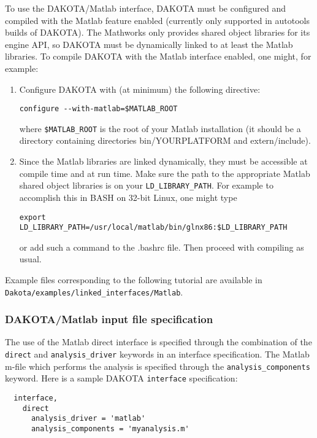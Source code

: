 To use the DAKOTA/Matlab interface, DAKOTA must be configured and
compiled with the Matlab feature enabled (currently only supported in
autotools builds of DAKOTA).  The Mathworks only provides shared
object libraries for its engine API, so DAKOTA must be dynamically
linked to at least the Matlab libraries.  To compile DAKOTA with the
Matlab interface enabled, one might, for example:
\begin{enumerate}
\item Configure DAKOTA with (at minimum) the following directive:
\begin{verbatim}
configure --with-matlab=$MATLAB_ROOT
\end{verbatim} %
where {\tt \$MATLAB\_ROOT} is the root of your Matlab installation (it should
be a directory containing directories bin/YOURPLATFORM and
extern/include).

\item Since the Matlab libraries are linked dynamically, they must be
accessible at compile time and at run time. Make sure the path to the
appropriate Matlab shared object libraries is on your 
{\tt LD\_LIBRARY\_PATH}.  For example to accomplish this in BASH on
32-bit Linux, one might type
\begin{verbatim}
export LD_LIBRARY_PATH=/usr/local/matlab/bin/glnx86:$LD_LIBRARY_PATH
\end{verbatim} %
or add such a command to the .bashrc file.  Then proceed with
compiling as usual.
\end{enumerate}

Example files corresponding to the following tutorial are available in \\ 
{\tt Dakota/examples/linked\_interfaces/Matlab}.

\subsubsection{DAKOTA/Matlab input file specification}

The use of the Matlab direct interface is specified through the
combination of the {\tt direct} and {\tt analysis\_driver} keywords in
an interface specification.  The Matlab m-file which performs the
analysis is specified through the {\tt analysis\_components} keyword.
Here is a sample DAKOTA {\tt interface} specification:
\begin{small}
\begin{verbatim}
  interface,
    direct
      analysis_driver = 'matlab'
      analysis_components = 'myanalysis.m'
\end{verbatim} 
\end{small}

